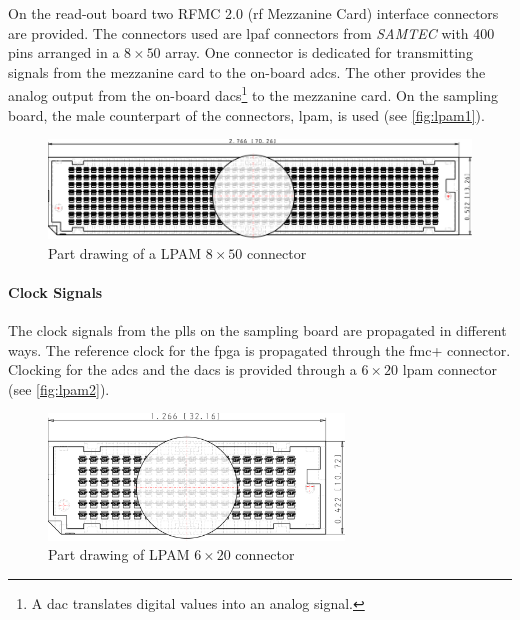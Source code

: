 On the read-out board two RFMC 2.0 (\gls{rf} Mezzanine Card) interface connectors are provided.
The connectors used are \gls{lpaf} connectors from \textit{SAMTEC} with 400 pins arranged in a $8\times50$ array.
One connector is dedicated for transmitting signals from the mezzanine card to the on-board \glspl{adc}.
The other provides the analog output from the on-board \glspl{dac}\footnote{A \gls{dac} translates digital values into an analog signal.} to the mezzanine card.
On the sampling board, the male counterpart of the connectors, \gls{lpam}, is used (see \autoref{fig:lpam1}).

\begin{figure}[tbh]
	\centering
	\includegraphics[width = \textwidth]{chap/04-theresa/img/connectors/lpam_50_top.pdf}
	\caption[LPAM $8\times50$ connector]{Part drawing of a LPAM $8\times50$ connector}
	\label{fig:lpam1}
\end{figure}


\paragraph{Clock Signals}
The clock signals from the \glspl{pll} on the sampling board are propagated in different ways.
The reference clock for the \gls{fpga} is propagated through the \gls{fmc}+ connector.
Clocking for the \glspl{adc} and the \glspl{dac} is provided through a $6\times20$ \gls{lpam} connector (see \autoref{fig:lpam2}).
\begin{figure}[tbh]
	\centering
	\includegraphics[width = 0.7\textwidth]{chap/04-theresa/img/connectors/lpam_20.pdf}
	\caption[LPAM $6\times20$ connector]{Part drawing of LPAM $6\times20$ connector}
	\label{fig:lpam2}
\end{figure}

